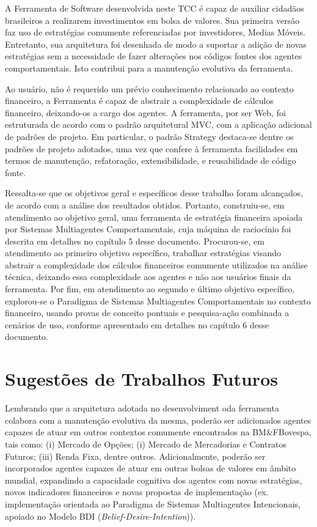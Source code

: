 A Ferramenta de Software desenvolvida neste TCC é capaz de auxiliar cidadãos brasileiros a realizarem investimentos em bolsa de valores. Sua primeira versão faz uso de estratégias comumente referenciadas por investidores, Medias Móveis.  Entretanto, sua arquitetura foi desenhada de modo a suportar a adição de novas estratégias sem a necessidade de fazer alterações nos códigos fontes dos agentes comportamentais. Isto contribui para a manutenção evolutiva da ferramenta.

Ao usuário, não é requerido um prévio conhecimento relacionado ao contexto financeiro, a Ferramenta é capaz de abstrair a complexidade de cálculos financeiro, deixando-os a cargo dos agentes. A ferramenta, por ser Web, foi estruturada de acordo com o padrão arquitetural MVC, com a aplicação adicional de padrões de projeto. Em particular, o padrão Strategy destaca-se dentre os padrões de projeto adotados, uma vez que confere à ferramenta facilidades em termos de manutenção, refatoração, extensibilidade, e reusabilidade de código fonte.

Ressalta-se que os objetivos geral e específicos desse trabalho foram alcançados, de acordo com a análise dos resultados obtidos. Portanto, construiu-se, em atendimento ao objetivo geral, uma ferramenta de estratégia financeira apoiada por Sistemas Multiagentes Comportamentais, cuja máquina de raciocínio foi descrita em detalhes no capítulo 5 desse documento. Procurou-se, em atendimento ao primeiro objetivo específico, trabalhar estratégias visando abstrair a complexidade dos cálculos financeiros comumente utilizados na análise técnica, deixando essa complexidade aos agentes e não aos usuários finais da ferramenta. Por fim, em atendimento ao segundo e último objetivo específico, explorou-se o Paradigma de Sistemas Multiagentes Comportamentais no contexto financeiro, usando provas de conceito pontuais e pesquisa-ação combinada a cenários de uso, conforme apresentado em detalhes no capítulo 6 desse documento.


\section{Sugestões de Trabalhos Futuros}

Lembrando que a arquitetura adotada no desenvolviment oda ferramenta colabora com a manutenção evolutiva da mesma, poderão ser adicionados agentes capazes de atuar em outros contextos comumente encontrados na BM\&FBovespa, tais como: (i) Mercado de Opções; (i) Mercado de Mercadorias e Contratos Futuros; (iii) Renda Fixa, dentre outros. Adicionalmente, poderão ser incorporados agentes capazes de atuar em outras bolsas de valores em âmbito mundial, expandindo a capacidade cognitiva dos agentes com novas estratégias, novos indicadores financeiros e novas propostas de implementação (ex. implementação orientada ao Paradigma de Sistemas Multiagentes Intencionais, apoiado no Modelo BDI (\textit{Belief-Desire-Intention})).

